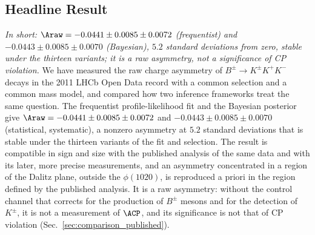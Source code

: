 \subsection{Headline Result}
\emph{In short: $\Araw=-0.0441\pm0.0085\pm0.0072$ (frequentist) and $-0.0443\pm0.0085\pm0.0070$ (Bayesian), $5.2$ standard deviations from zero, stable under the thirteen variants; it is a raw asymmetry, not a significance of CP violation.}
We have measured the raw charge asymmetry of $B^\pm\to K^\pm K^+K^-$ decays in the 2011 LHCb Open Data record with a common selection and a common mass model, and compared how two inference frameworks treat the same question. The frequentist profile-likelihood fit and the Bayesian posterior give $\Araw=-0.0441\pm0.0085\pm0.0072$ and $-0.0443\pm0.0085\pm0.0070$ (statistical, systematic), a nonzero asymmetry at $5.2$ standard deviations that is stable under the thirteen variants of the fit and selection. The result is compatible in sign and size with the published analysis of the same data and with its later, more precise measurements, and an asymmetry concentrated in a region of the Dalitz plane, outside the $\phi(1020)$, is reproduced a priori in the region defined by the published analysis. It is a raw asymmetry: without the control channel that corrects for the production of $B^\pm$ mesons and for the detection of $K^\pm$, it is not a measurement of $\ACP$, and its significance is not that of CP violation (Sec.~\ref{sec:comparison_published}).

